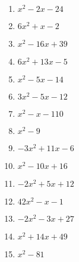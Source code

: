 \begin{exercise}
  \begin{multicols}{2}
  
  \begin{enumerate}[sepno]
  \item \(x^2-2x-24\)
  \item \(6x^2+x-2\)
  \item \(x^2-16x+39\)
  \item \(6x^2+13x-5\)
  \item \(x^2-5x-14\)
  \item \(3x^2-5x-12\)
  \item \(x^2-x-110\)
  \item \(x^2-9\)  \columnbreak
  \item \(-3x^2+11x-6\)
  \item \(x^2-10x+16\)
  \item \(-2x^2+5x+12\)
  \item \(42x^2-x-1\)
  \item \(-2x^2-3x+27\)
  \item \(x^2+14x+49\)
  \item \(x^2-81\)
  \end{enumerate}
\end{multicols}
\end{exercise}

